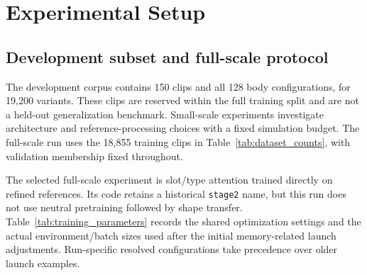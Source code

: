 \section{Experimental Setup}\label{sec:experiments}

\subsection{Development subset and full-scale protocol}

The development corpus contains 150 clips and all 128 body configurations,
for 19,200 variants. These clips are reserved within the full training split
and are not a held-out generalization benchmark. Small-scale experiments
investigate architecture and reference-processing choices with a fixed
simulation budget. The full-scale run uses the 18,855 training clips in
Table~\ref{tab:dataset_counts}, with validation membership fixed throughout.

The selected full-scale experiment is slot/type attention trained directly on
refined references. Its code retains a historical \texttt{stage2} name, but
this run does not use neutral pretraining followed by shape transfer.
Table~\ref{tab:training_parameters} records the shared optimization settings
and the actual environment/batch sizes used after the initial memory-related
launch adjustments. Run-specific resolved configurations take precedence
over older launch examples.

